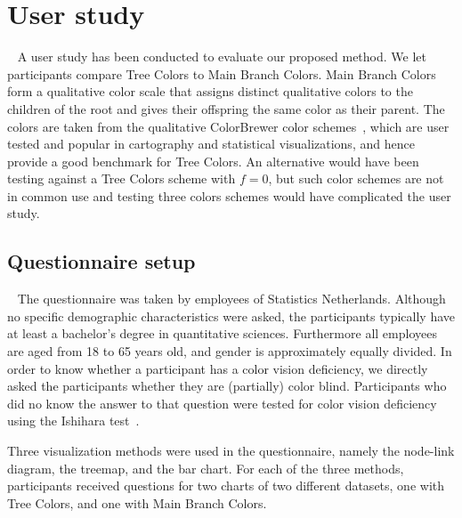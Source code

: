 \documentclass[journal]{vgtc}                %
\begin{document}
\section{User study}~\label{secuser}
A user study has been conducted to evaluate our proposed method. We let participants compare Tree Colors to Main Branch Colors. Main Branch Colors form a qualitative color scale that assigns distinct qualitative colors to the children of the root and gives their offspring the same color as their parent. The colors are taken from the qualitative ColorBrewer color schemes~\cite{brewer03}, which are user tested and popular in cartography and statistical visualizations, and hence provide a good benchmark for Tree Colors. An alternative would have been testing
against a Tree Colors scheme with $f=0$, but such color schemes are not in common 
use and testing three colors schemes would have complicated the user study.

\subsection{Questionnaire setup}~\label{secusersetup}
The questionnaire was taken by employees of Statistics Netherlands. Although no specific 
demographic characteristics were asked, the participants typically have at least a bachelor's degree in 
quantitative sciences. Furthermore all employees are aged from 18 to 65 years old, and gender is 
approximately equally divided. In order to know whether 
a participant has a color vision deficiency, we directly asked the participants 
whether they are (partially) color blind. Participants who did no know the answer
to that question were tested for 
color vision deficiency using the Ishihara test~\cite{ishihara}. 

Three visualization methods were used in the questionnaire, namely the node-link diagram, the treemap, and the bar chart. For each of the three methods, participants received questions for two charts of two different datasets, one with Tree Colors, and one with Main Branch Colors. 
\end{document}
